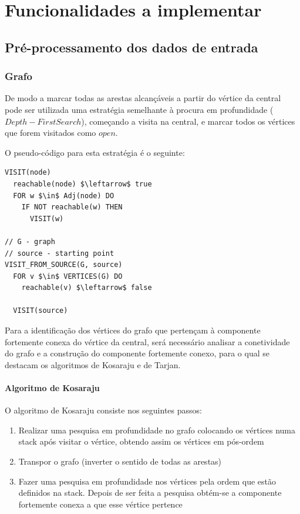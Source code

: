 \documentclass[article, a4paper, 12pt, oneside]{memoir}
\begin{document}
\chapter[Funcionalidades a implementar][Funcionalidades a implementar]{Funcionalidades a implementar} \label{\thechapter}

\section{Pré-processamento dos dados de entrada}

\subsection{Grafo}
De modo a marcar todas as arestas alcançáveis a partir do vértice da central pode ser utilizada uma estratégia semelhante à procura em profundidade ($Depth-First Search$), começando a visita na central, e marcar todos os vértices que forem visitados como $open$.

O pseudo-código para esta estratégia é o seguinte:

\begin{lstlisting}[frame=single, mathescape=true]
VISIT(node)
  reachable(node) $\leftarrow$ true
  FOR w $\in$ Adj(node) DO
    IF NOT reachable(w) THEN
      VISIT(w)

// G - graph
// source - starting point
VISIT_FROM_SOURCE(G, source)
  FOR v $\in$ VERTICES(G) DO
    reachable(v) $\leftarrow$ false

  VISIT(source)
\end{lstlisting}

Para a identificação dos vértices do grafo que pertençam à componente fortemente conexa do vértice da central, será necessário analisar a conetividade do grafo e a construção do componente fortemente conexo, para o qual se destacam os algoritmos de Kosaraju e de Tarjan.

\subsubsection{Algoritmo de Kosaraju}

O algoritmo de Kosaraju consiste nos seguintes passos:
\begin{enumerate}
	\item Realizar uma pesquisa em profundidade no grafo colocando os vértices numa stack após visitar o vértice, obtendo assim os vértices em pós-ordem
	\item Transpor o grafo (inverter o sentido de todas as arestas)
	\item Fazer uma pesquisa em profundidade nos vértices pela ordem que estão definidos na stack. Depois de ser feita a pesquisa obtém-se a componente fortemente conexa a que esse vértice pertence
\end{enumerate}
\end{document}
